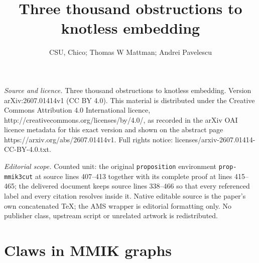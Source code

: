 \documentclass[10pt,a4paper]{amsart}
\newtheorem{lemma}[theorem]{Lemma}
\newcommand{\R}{\mathbb R}
\begin{document}
\title[Three thousand obstructions to knotless embedding]{Three thousand obstructions to knotless embedding}
\author{CSU, Chico; Thomas W Mattman; Andrei Pavelescu}
\date{}
\maketitle
\noindent\emph{Source and licence.} Three thousand obstructions to knotless embedding. Version arXiv:2607.01414v1 (CC BY 4.0). This material is distributed under the Creative Commons Attribution 4.0 International licence, http://creativecommons.org/licenses/by/4.0/, as recorded in the arXiv OAI licence metadata for this exact version and shown on the abstract page https://arxiv.org/abs/2607.01414v1. Full rights notice: licenses/arxiv-2607.01414-CC-BY-4.0.txt.\par\smallskip
\noindent\textit{Editorial scope.} Counted unit: the original \texttt{proposition} environment \texttt{prop-mmik3cut} at source lines 407--413 together with its complete proof at lines 415--465; the delivered document keeps source lines 338--466 so that every referenced label and every citation resolves inside it. Native editable source is the paper's own concatenated TeX; the AMS wrapper is editorial formatting only. No publisher class, upstream script or unrelated artwork is redistributed.
\section{Claws in MMIK graphs}
\label{sec:claws}



\end{document}
